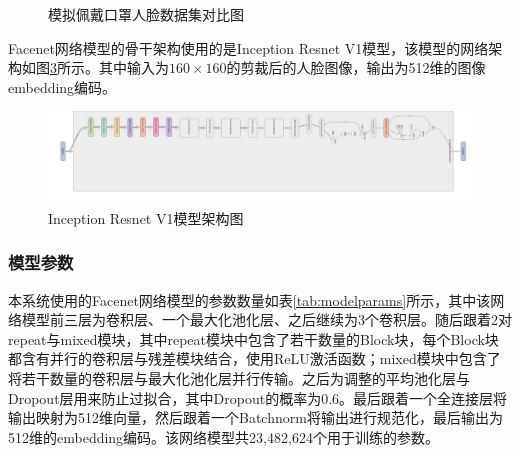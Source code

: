 \begin{figure}[H]
\begin{subfigure}{.45\textwidth}
        \label{fig:webmakedface}
    \end{subfigure}
    \caption{模拟佩戴口罩人脸数据集对比图}
    \label{fig:cmrsds}
\end{figure}

Facenet网络模型的骨干架构使用的是Inception Resnet V1模型，该模型的网络架构如图\ref{fig:resnetarc}所示。其中输入为$160\times 160$的剪裁后的人脸图像，输出为512维的图像embedding编码。

\begin{figure}[H]
    \centering
    \includegraphics[width=\textwidth]{figures/5modelarc.png}
    \caption{Inception Resnet V1模型架构图}
    \label{fig:resnetarc}
\end{figure}

\subsubsection{模型参数}

本系统使用的Facenet网络模型的参数数量如表\ref{tab:modelparams}所示，其中该网络模型前三层为卷积层、一个最大化池化层、之后继续为3个卷积层。随后跟着2对repeat与mixed模块，其中repeat模块中包含了若干数量的Block块，每个Block块都含有并行的卷积层与残差模块结合，使用ReLU激活函数；mixed模块中包含了将若干数量的卷积层与最大化池化层并行传输。之后为调整的平均池化层与Dropout层用来防止过拟合，其中Dropout的概率为0.6。最后跟着一个全连接层将输出映射为512维向量，然后跟着一个Batchnorm将输出进行规范化，最后输出为512维的embedding编码。该网络模型共23,482,624个用于训练的参数。

